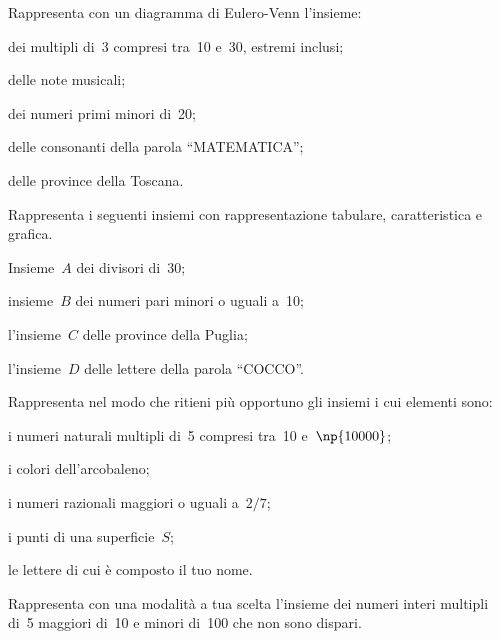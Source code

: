 \begin{esercizio}
\label{ese:\thechapter.33}
Rappresenta con un diagramma di Eulero-Venn l'insieme:
\begin{enumeratea}
\item dei multipli di~3 compresi tra~10 e~30, estremi inclusi;
\item delle note musicali;
\item dei numeri primi minori di~20;
\item delle consonanti della parola ``MATEMATICA'';
\item delle province della Toscana.
\end{enumeratea}
\end{esercizio}

\begin{esercizio}
\label{ese:\thechapter.34}
Rappresenta i seguenti insiemi con rappresentazione tabulare, caratteristica e grafica.
\begin{enumeratea}
\item Insieme~$A$ dei divisori di~30;
\item insieme~$B$ dei numeri pari minori o uguali a~10;
\item l'insieme~$C$ delle province della Puglia;
\item l'insieme~$D$ delle lettere della parola ``COCCO''.
\end{enumeratea}
\end{esercizio}

\begin{esercizio}
\label{ese:\thechapter.35}
Rappresenta nel modo che ritieni più opportuno gli insiemi i cui elementi sono:
\begin{enumeratea}
\item i numeri naturali multipli di~5 compresi tra~10 e~$\np{10000}$;
\item i colori dell'arcobaleno;
\item i numeri razionali maggiori o uguali a~$2/7$;
\item i punti di una superficie~$S$;
\item le lettere di cui è composto il tuo nome.
\end{enumeratea}
\end{esercizio}

\begin{esercizio}
\label{ese:\thechapter.36}
Rappresenta con una modalità a tua scelta l'insieme dei numeri interi multipli di~5 maggiori di~10 e minori di~100 che non
sono dispari.
\end{esercizio}

